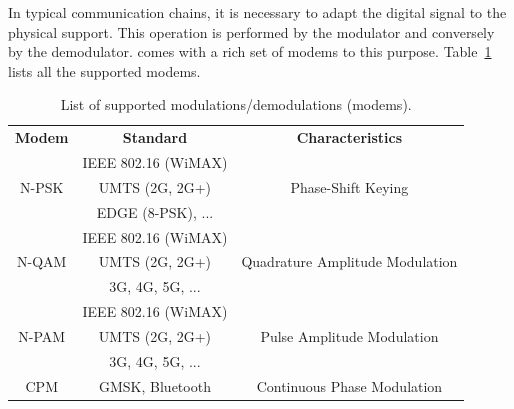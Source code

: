 In typical communication chains, it is necessary to adapt the digital signal
to the physical support. This operation is performed by the modulator and
conversely by the demodulator. \AFFECT comes with a rich set of modems to this
purpose. Table~\ref{tab:lib_modems} lists all the supported modems.

\begin{table}
  \centering
  \caption{List of supported modulations/demodulations (modems).}
  \label{tab:lib_modems}
  \begin{tabular}{ c | c | c }
  \multirow{2}{*}{\textbf{Modem}}        & \multirow{2}{*}{\textbf{Standard}} & \multirow{2}{*}{\textbf{Characteristics}} \\
                                         &                                    &                                           \\
  \hline
  \hline
  \multirow{3}{*}{{N-PSK}}               & IEEE 802.16 (WiMAX)                &                                           \\
                                         & UMTS (2G, 2G+)                     & Phase-Shift Keying                        \\
                                         & EDGE (8-PSK), ...                  &                                           \\
  \hline
  \multirow{3}{*}{{N-QAM}}               & IEEE 802.16 (WiMAX)                &                                           \\
                                         & UMTS (2G, 2G+)                     & Quadrature Amplitude Modulation           \\
                                         & 3G, 4G, 5G, ...                    &                                           \\
  \hline
  \multirow{3}{*}{{N-PAM}}               & IEEE 802.16 (WiMAX)                &                                           \\
                                         & UMTS (2G, 2G+)                     & Pulse Amplitude Modulation                \\
                                         & 3G, 4G, 5G, ...                    &                                           \\
  \hline
  \multirow{2}{*}{{CPM}}                 & GMSK, Bluetooth                    & Continuous Phase Modulation               \\

\end{tabular}
\end{table}
